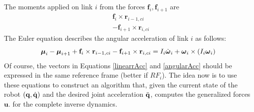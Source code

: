 \documentclass[10pt, a4paper]{report}
\newcommand{\q}{{\mathbf q}}
\begin{document}
The moments applied on link $i$ from the forces $\mathbf f_i,\mathbf f_{i+1}$ are\begin{align}
   & \mathbf f_i\times \mathbf r_{i-1,ci}\\ 
   & -\mathbf f_{i+1}\times \mathbf r_{i,ci}
\end{align}
The Euler equation describes the angular acceleration of link $i$ as follows:\begin{equation}\label{angularAcc}
    {\boldsymbol{\mu}}_i-{\boldsymbol{\mu}}_{i+1}+ \mathbf f_i\times \mathbf r_{i-1,ci}-\mathbf f_{i+1}\times \mathbf r_{i,ci}=I_i\dot{{\boldsymbol{\omega}}}_i+{\boldsymbol{\omega}}_i\times (I_i{\boldsymbol{\omega}}_i)
\end{equation}
Of course, the vectors in Equations \eqref{linearrAcc} and  \eqref{angularAcc} should be expressed in the same reference frame (better if $RF_i$). The idea now is to use these equations to construct an algorithm that, given the current state of the robot $(\q,\dq)$ and the desired joint acceleration ${\ddot{\mathbf q}}$, computes the generalized forces $\mathbf u$. for the complete inverse dynamics. \bigskip 
\end{document}
